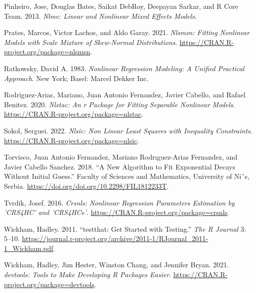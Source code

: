 \begin{CSLReferences}
Pinheiro, Jose, Douglas Bates, Saikat DebRoy, Deepayan Sarkar, and R Core Team. 2013. \emph{Nlme: Linear and Nonlinear Mixed Effects Models}.

Prates, Marcos, Victor Lachos, and Aldo Garay. 2021. \emph{Nlsmsn: Fitting Nonlinear Models with Scale Mixture of Skew-Normal Distributions}. \url{https://CRAN.R-project.org/package=nlsmsn}.

Ratkowsky, David A. 1983. \emph{Nonlinear Regression Modeling: A Unified Practical Approach}. New York; Basel: Marcel Dekker Inc.

Rodriguez-Arias, Mariano, Juan Antonio Fernandez, Javier Cabello, and Rafael Benitez. 2020. \emph{Nlstac: An r Package for Fitting Separable Nonlinear Models}. \url{https://CRAN.R-project.org/package=nlstac}.

Sokol, Serguei. 2022. \emph{Nlsic: Non Linear Least Squares with Inequality Constraints}. \url{https://CRAN.R-project.org/package=nlsic}.

Torvisco, Juan Antonio Fernandez, Mariano Rodrıguez-Arias Fernandez, and Javier Cabello Sanchez. 2018. {``A New Algorithm to Fit Exponential Decays Without Initial Guess.''} {Faculty of Sciences and Mathematics, University of Niˇs, Serbia}. \url{https://doi.org/doi.org/10.2298/FIL1812233T}.

Tvrdík, Josef. 2016. \emph{Crsnls: Nonlinear Regression Parameters Estimation by 'CRS4HC' and 'CRS4HCe'}. \url{https://CRAN.R-project.org/package=crsnls}.

Wickham, Hadley. 2011. {``{testthat: Get Started with Testing}.''} \emph{The R Journal} 3: 5--10. \url{https://journal.r-project.org/archive/2011-1/RJournal_2011-1_Wickham.pdf}.

Wickham, Hadley, Jim Hester, Winston Chang, and Jennifer Bryan. 2021. \emph{{devtools: Tools to Make Developing R Packages Easier}}. \url{https://CRAN.R-project.org/package=devtools}.

\end{CSLReferences}



\address{%
John C. Nash\\
retired professor, University of Ottawa\\%
Telfer School of Management\\ Ottawa ON Canada K1N 6N5\\
%
%
\textit{ORCiD: \href{https://orcid.org/0000-0002-2762-8039}{0000-0002-2762-8039}}\\%
\href{mailto:profjcnash@gmail.com}{\nolinkurl{profjcnash@gmail.com}}%
}

\address{%
Arkajyoti Bhattacharjee\\
Indian Institute of Technology\\%
Department of Mathematics and Statistics\\ Kanpur\\
%
%
%
\href{mailto:arkastat98@gmail.com}{\nolinkurl{arkastat98@gmail.com}}%
}
